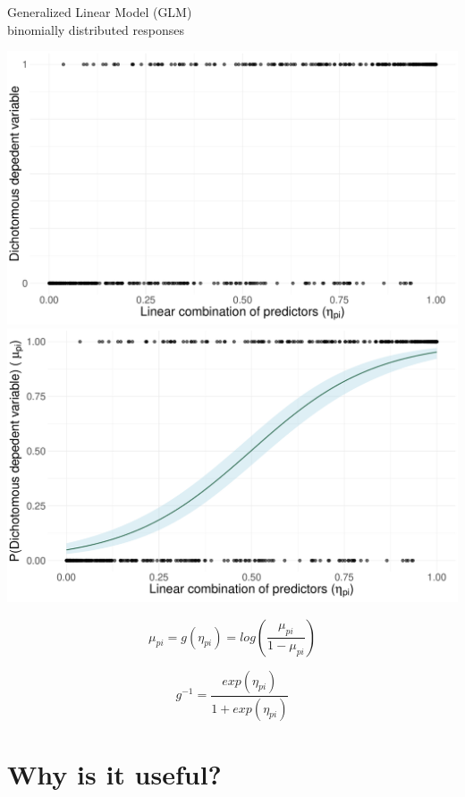 \documentclass{beamer}
\begin{document}
\begin{frame}

\begin{center}
	Generalized Linear Model (GLM)\\
	\small binomially distributed responses
\end{center}

	\begin{overprint}
					\centering
					\includegraphics[width=.70\linewidth]{baseGLM.pdf}
			\onslide<3>
				\centering
				\includegraphics[width=.70\linewidth]{linkGLM.pdf}
	\end{overprint}


		\begin{equation*}
	\mu_{pi} = g(\eta_{pi}) = log\left(\frac{\mu_{pi}}{1 - \mu_{pi}}\right)
\end{equation*}

\begin{equation*}
	g^{-1} = \frac{exp(\eta_{pi})}{1 + exp(\eta_{pi})}
\end{equation*}
\end{frame}


\section{Why is it useful?}
\end{document}
